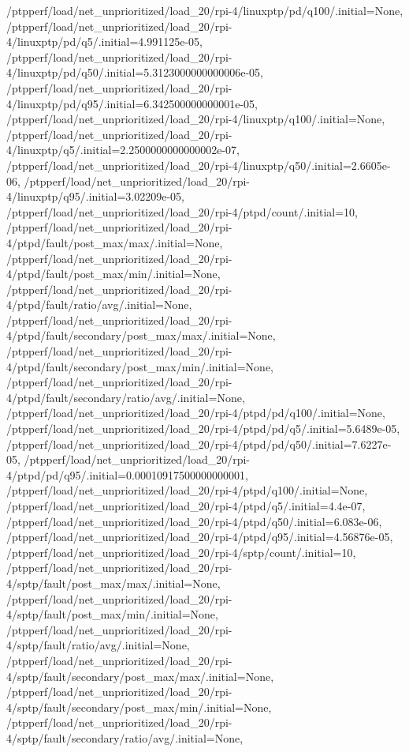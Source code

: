 {    /ptpperf/load/net_unprioritized/load_20/rpi-4/linuxptp/pd/q100/.initial=None,
    /ptpperf/load/net_unprioritized/load_20/rpi-4/linuxptp/pd/q5/.initial=4.991125e-05,
    /ptpperf/load/net_unprioritized/load_20/rpi-4/linuxptp/pd/q50/.initial=5.3123000000000006e-05,
    /ptpperf/load/net_unprioritized/load_20/rpi-4/linuxptp/pd/q95/.initial=6.342500000000001e-05,
    /ptpperf/load/net_unprioritized/load_20/rpi-4/linuxptp/q100/.initial=None,
    /ptpperf/load/net_unprioritized/load_20/rpi-4/linuxptp/q5/.initial=2.2500000000000002e-07,
    /ptpperf/load/net_unprioritized/load_20/rpi-4/linuxptp/q50/.initial=2.6605e-06,
    /ptpperf/load/net_unprioritized/load_20/rpi-4/linuxptp/q95/.initial=3.02209e-05,
    /ptpperf/load/net_unprioritized/load_20/rpi-4/ptpd/count/.initial=10,
    /ptpperf/load/net_unprioritized/load_20/rpi-4/ptpd/fault/post_max/max/.initial=None,
    /ptpperf/load/net_unprioritized/load_20/rpi-4/ptpd/fault/post_max/min/.initial=None,
    /ptpperf/load/net_unprioritized/load_20/rpi-4/ptpd/fault/ratio/avg/.initial=None,
    /ptpperf/load/net_unprioritized/load_20/rpi-4/ptpd/fault/secondary/post_max/max/.initial=None,
    /ptpperf/load/net_unprioritized/load_20/rpi-4/ptpd/fault/secondary/post_max/min/.initial=None,
    /ptpperf/load/net_unprioritized/load_20/rpi-4/ptpd/fault/secondary/ratio/avg/.initial=None,
    /ptpperf/load/net_unprioritized/load_20/rpi-4/ptpd/pd/q100/.initial=None,
    /ptpperf/load/net_unprioritized/load_20/rpi-4/ptpd/pd/q5/.initial=5.6489e-05,
    /ptpperf/load/net_unprioritized/load_20/rpi-4/ptpd/pd/q50/.initial=7.6227e-05,
    /ptpperf/load/net_unprioritized/load_20/rpi-4/ptpd/pd/q95/.initial=0.00010917500000000001,
    /ptpperf/load/net_unprioritized/load_20/rpi-4/ptpd/q100/.initial=None,
    /ptpperf/load/net_unprioritized/load_20/rpi-4/ptpd/q5/.initial=4.4e-07,
    /ptpperf/load/net_unprioritized/load_20/rpi-4/ptpd/q50/.initial=6.083e-06,
    /ptpperf/load/net_unprioritized/load_20/rpi-4/ptpd/q95/.initial=4.56876e-05,
    /ptpperf/load/net_unprioritized/load_20/rpi-4/sptp/count/.initial=10,
    /ptpperf/load/net_unprioritized/load_20/rpi-4/sptp/fault/post_max/max/.initial=None,
    /ptpperf/load/net_unprioritized/load_20/rpi-4/sptp/fault/post_max/min/.initial=None,
    /ptpperf/load/net_unprioritized/load_20/rpi-4/sptp/fault/ratio/avg/.initial=None,
    /ptpperf/load/net_unprioritized/load_20/rpi-4/sptp/fault/secondary/post_max/max/.initial=None,
    /ptpperf/load/net_unprioritized/load_20/rpi-4/sptp/fault/secondary/post_max/min/.initial=None,
    /ptpperf/load/net_unprioritized/load_20/rpi-4/sptp/fault/secondary/ratio/avg/.initial=None,
}
